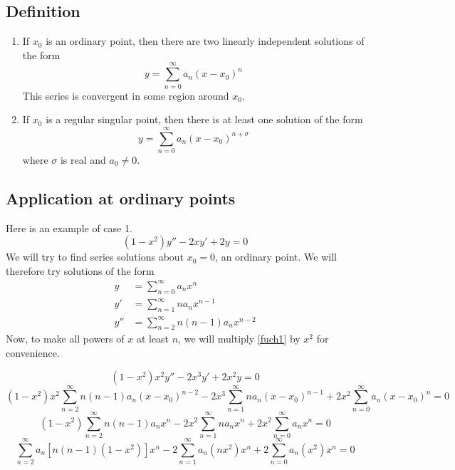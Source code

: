 \subsection{Definition}
\begin{theorem}
	\begin{enumerate}
		\item If \(x_0\) is an ordinary point, then there are two linearly independent solutions of the form
		      \[
			      y = \sum_{n=0}^\infty a_n(x-x_0)^n
		      \]
		      This series is convergent in some region around \(x_0\).
		\item If \(x_0\) is a regular singular point, then there is at least one solution of the form
		      \[
			      y = \sum_{n=0}^\infty a_n(x-x_0)^{n + \sigma}
		      \]
		      where \(\sigma\) is real and \(a_0 \neq 0\).
	\end{enumerate}
\end{theorem}

\subsection{Application at ordinary points}
Here is an example of case 1.
\begin{equation}\label{fuch1}
	(1-x^2)y'' - 2xy' + 2y = 0
\end{equation}
We will try to find series solutions about \(x_0=0\), an ordinary point.
We will therefore try solutions of the form
\begin{align*}
	y   & = \sum_{n=0}^\infty a_n x^n           \\
	y'  & = \sum_{n=1}^\infty na_n x^{n-1}      \\
	y'' & = \sum_{n=2}^\infty n(n-1)a_n x^{n-2}
\end{align*}
Now, to make all powers of \(x\) at least \(n\), we will multiply \eqref{fuch1} by \(x^2\) for convenience.

\[
	(1-x^2)x^2y'' - 2x^3y' + 2x^2y = 0
\]
\[
	(1-x^2)x^2\sum_{n=2}^\infty n(n-1)a_n(x-x_0)^{n-2} - 2x^3\sum_{n=1}^\infty na_n(x-x_0)^{n-1} + 2x^2\sum_{n=0}^\infty a_n(x-x_0)^n = 0
\]
\[
	(1-x^2)\sum_{n=2}^\infty n(n-1)a_n x^n - 2x^2\sum_{n=1}^\infty na_n x^n + 2x^2\sum_{n=0}^\infty a_n x^n = 0
\]
\[
	\sum_{n=2}^\infty a_n[n(n-1)(1-x^2)]x^n - 2\sum_{n=1}^\infty a_n(nx^2)x^n + 2\sum_{n=0}^\infty a_n(x^2)x^n = 0
\]

